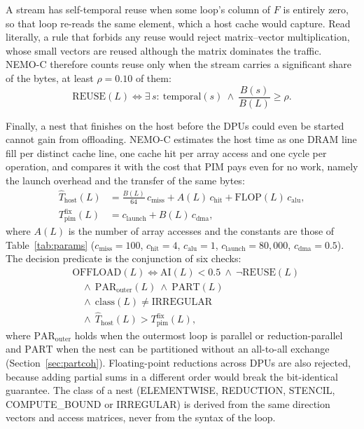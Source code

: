 \documentclass{ieeeaccess}
\begin{document}
A stream has self-temporal reuse when some loop's column of $F$ is entirely zero, so that loop re-reads the same element, which a host cache would capture. Read literally, a rule that forbids any reuse would reject matrix--vector multiplication, whose small vectors are reused although the matrix dominates the traffic. NEMO-C therefore counts reuse only when the stream carries a significant share of the bytes, at least $\rho = 0.10$ of them:
\begin{equation}
\mathrm{REUSE}(L) \iff \exists\, s:\ \mathrm{temporal}(s)\ \wedge\ \frac{B(s)}{B(L)} \ge \rho.
\label{eq:reuse}
\end{equation}

Finally, a nest that finishes on the host before the DPUs could even be started cannot gain from offloading. NEMO-C estimates the host time as one DRAM line fill per distinct cache line, one cache hit per array access and one cycle per operation, and compares it with the cost that PIM pays even for no work, namely the launch overhead and the transfer of the same bytes:
\begin{equation}
\begin{aligned}
\hat{T}_{\mathrm{host}}(L) &= \tfrac{B(L)}{64}\,c_{\mathrm{miss}} + A(L)\,c_{\mathrm{hit}} + \mathrm{FLOP}(L)\,c_{\mathrm{alu}},\\
T^{\mathrm{fix}}_{\mathrm{pim}}(L) &= c_{\mathrm{launch}} + B(L)\,c_{\mathrm{dma}},
\end{aligned}
\label{eq:size}
\end{equation}
where $A(L)$ is the number of array accesses and the constants are those of Table~\ref{tab:params} ($c_{\mathrm{miss}}=100$, $c_{\mathrm{hit}}=4$, $c_{\mathrm{alu}}=1$, $c_{\mathrm{launch}}=80{,}000$, $c_{\mathrm{dma}}=0.5$). The decision predicate is the conjunction of six checks:
\begin{equation}
\begin{aligned}
&\mathrm{OFFLOAD}(L) \iff \mathrm{AI}(L) < 0.5 \ \wedge\ \neg\mathrm{REUSE}(L)\\
&\quad \wedge\ \mathrm{PAR}_{\mathrm{outer}}(L) \ \wedge\ \mathrm{PART}(L)\\
&\quad \wedge\ \mathrm{class}(L) \ne \mathrm{IRREGULAR}\\
&\quad \wedge\ \hat{T}_{\mathrm{host}}(L) > T^{\mathrm{fix}}_{\mathrm{pim}}(L),
\end{aligned}
\label{eq:predicate}
\end{equation}
where $\mathrm{PAR}_{\mathrm{outer}}$ holds when the outermost loop is parallel or reduction-parallel and $\mathrm{PART}$ when the nest can be partitioned without an all-to-all exchange (Section~\ref{sec:partcoh}). Floating-point reductions across DPUs are also rejected, because adding partial sums in a different order would break the bit-identical guarantee. The class of a nest (ELEMENTWISE, REDUCTION, STENCIL, COMPUTE\_BOUND or IRREGULAR) is derived from the same direction vectors and access matrices, never from the syntax of the loop.
\end{document}

